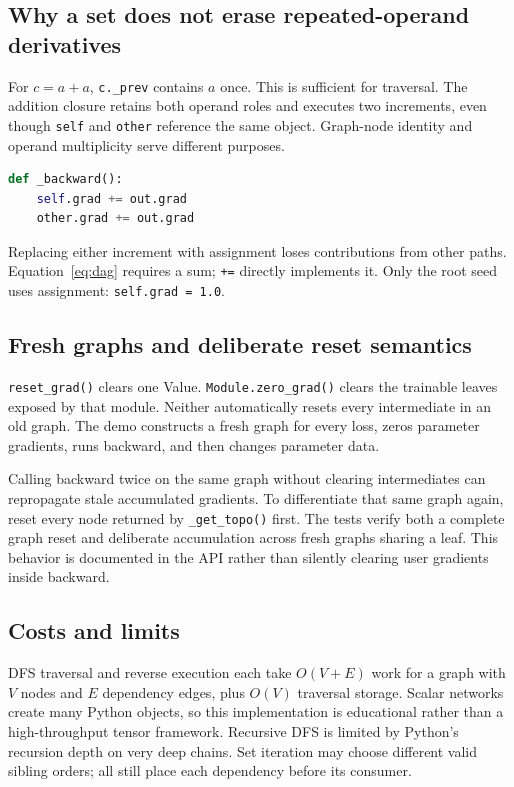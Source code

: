 \documentclass[11pt,a4paper]{article}
\newcommand{\code}[1]{\texttt{#1}}
\begin{document}
\subsection{Why a set does not erase repeated-operand derivatives}
For $c=a+a$, \code{c.\_prev} contains $a$ once. This is sufficient for
traversal. The addition closure retains both operand roles and executes two
increments, even though \code{self} and \code{other} reference the same object.
Graph-node identity and operand multiplicity serve different purposes.

\begin{lstlisting}[language=Python]
def _backward():
    self.grad += out.grad
    other.grad += out.grad
\end{lstlisting}
Replacing either increment with assignment loses contributions from other
paths. Equation~\ref{eq:dag} requires a sum; \code{+=} directly implements it.
Only the root seed uses assignment: \code{self.grad = 1.0}.

\subsection{Fresh graphs and deliberate reset semantics}
\code{reset\_grad()} clears one Value. \code{Module.zero\_grad()} clears the
trainable leaves exposed by that module. Neither automatically resets every
intermediate in an old graph. The demo constructs a fresh graph for every loss,
zeros parameter gradients, runs backward, and then changes parameter data.

Calling backward twice on the same graph without clearing intermediates can
repropagate stale accumulated gradients. To differentiate that same graph
again, reset every node returned by \code{\_get\_topo()} first. The tests
verify both a complete graph reset and deliberate accumulation across fresh
graphs sharing a leaf. This behavior is documented in the API rather than
silently clearing user gradients inside backward.

\subsection{Costs and limits}
DFS traversal and reverse execution each take $O(V+E)$ work for a graph with
$V$ nodes and $E$ dependency edges, plus $O(V)$ traversal storage. Scalar
networks create many Python objects, so this implementation is educational
rather than a high-throughput tensor framework. Recursive DFS is limited by
Python's recursion depth on very deep chains. Set iteration may choose different
valid sibling orders; all still place each dependency before its consumer.
\clearpage
\end{document}
